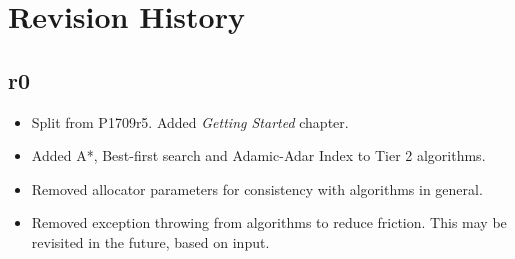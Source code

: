\section{Revision History}

\subsection*{\paperno r0}

\begin{itemize}
      \item Split from P1709r5. Added \textit{Getting Started} chapter.
      \item Added A*, Best-first search and Adamic-Adar Index to Tier 2 algorithms.
      \item Removed allocator parameters for consistency with algorithms in general.
      \item Removed exception throwing from algorithms to reduce friction. 
            This may be revisited in the future, based on input.
\end{itemize}
